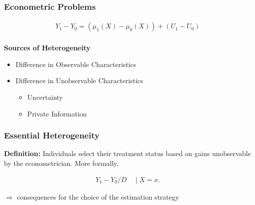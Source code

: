 \begin{frame}
\frametitle{Econometric Problems}

\begin{align*}
Y_1 - Y_0 = (\mu_1(X) - \mu_0(X)) + (U_1 - U_0)\\
\end{align*}

\textbf{Sources of Heterogeneity}
\begin{itemize}
	\item Difference in Observable Characteristics
	\item Difference in Unobservable Characteristics
	\begin{itemize}
		\item  Uncertainty 
		\item Private Information
	\end{itemize}
\end{itemize}

\end{frame}


\begin{frame}
\frametitle{Essential Heterogeneity}

\textbf{Definition:} Individuals select their treatment status based on
gains unobservable by the econometrician. More formally,

\begin{align*}
Y_1 - Y_0 / D\quad \mid X = x.
\end{align*}

\(\Rightarrow\) consequences for the choice of the estimation strategy

\end{frame}


